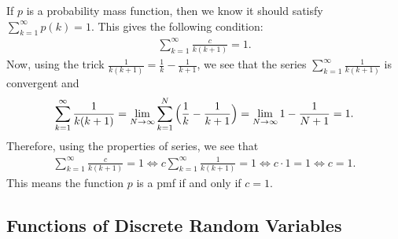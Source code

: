     \begin{problem}
    If $p$ is a probability mass function, then we know it should satisfy $\sum_{k = 1}^\infty p(k) = 1$. This gives the following condition:
        \begin{align*}
        \sum_{k = 1}^\infty \frac{c}{k (k + 1)} = 1 .
        \end{align*} 
    Now, using the trick $\frac{1}{k (k + 1)} = \frac{1}{k} - \frac{1}{k + 1}$, we see that the series $\sum_{k = 1}^\infty  \frac{1}{k (k + 1)}$ is convergent and
        \begin{align*}
        \sum_{k = 1}^\infty \frac{1}{k (k + 1)} = \lim_{N \rightarrow \infty} \sum_{k = 1}^N \Big( \frac{1}{k} - \frac{1}{k + 1} \Big) = \lim_{N \rightarrow \infty} 1 - \frac{1}{N + 1} = 1 .
        \end{align*} 
    Therefore, using the properties of series, we see that
    \begin{align*}
    \sum_{k = 1}^\infty \frac{c}{k (k + 1)} = 1 \iff c \sum_{k = 1}^\infty \frac{1}{k (k + 1)} = 1 \iff c \cdot 1 = 1 \iff c = 1 .
    \end{align*} 
    This means the function $p$ is a pmf if and only if $c = 1$. 
    \end{problem}
    
\subsection{Functions of Discrete Random Variables}
    

